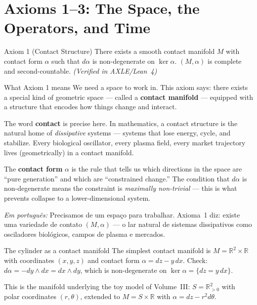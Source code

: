 \documentclass[12pt, openright]{book}
\theoremstyle{definition}
\theoremstyle{remark}
\begin{document}
\section{Axioms 1--3: The Space, the Operators, and Time}

\begin{formalbox}{Axiom 1 (Contact Structure)}
There exists a smooth contact manifold $M$ with contact form
$\alpha$ such that $d\alpha$ is non-degenerate on $\ker\alpha$.
$(M,\alpha)$ is complete and second-countable.
\hfill\textit{(Verified in AXLE/Lean~4)}
\end{formalbox}

\begin{studentbox}{What Axiom 1 means}
We need a space to work in. This axiom says: there exists
a special kind of geometric space --- called a
\textbf{contact manifold} --- equipped with a structure that
encodes how things change and interact.

The word \textbf{contact} is precise here. In mathematics,
a contact structure is the natural home of \textit{dissipative}
systems --- systems that lose energy, cycle, and stabilize.
Every biological oscillator, every plasma field, every market
trajectory lives (geometrically) in a contact manifold.

The \textbf{contact form} $\alpha$ is the rule that tells us
which directions in the space are ``pure generation'' and
which are ``constrained change.'' The condition that $d\alpha$
is non-degenerate means the constraint is \textit{maximally
non-trivial} --- this is what prevents collapse to a lower-dimensional
system.

\textit{Em português:}
Precisamos de um espaço para trabalhar. Axioma~1 diz: existe
uma variedade de contato $(M,\alpha)$ --- o lar natural de sistemas
dissipativos como osciladores biológicos, campos de plasma e mercados.
\end{studentbox}

\begin{examplebox}{The cylinder as a contact manifold}
The simplest contact manifold is $M = \mathbb{R}^2 \times \mathbb{R}$
with coordinates $(x, y, z)$ and contact form $\alpha = dz - y\,dx$.
Check: $d\alpha = -dy \wedge dx = dx \wedge dy$, which is
non-degenerate on $\ker\alpha = \{dz = y\,dx\}$.

This is the manifold underlying the toy model of Volume~III:
$S = \mathbb{R}^2_{>0}$ with polar coordinates $(r,\theta)$,
extended to $M = S \times \mathbb{R}$ with $\alpha = dz - r^2 d\theta$.
\end{examplebox}
\end{document}
